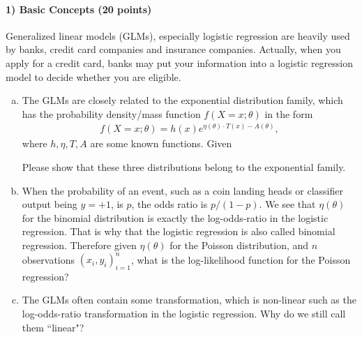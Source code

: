 \documentclass[11pt]{article}
\begin{document}
\paragraph{1) Basic Concepts (20 points)}
Generalized linear models (GLMs), especially logistic regression are heavily used by banks, credit card companies and insurance companies. Actually, when you apply for a credit card, banks may put your information into a logistic regression model to decide whether you are eligible.
\begin{enumerate}[(a)]
\item The GLMs are closely related to the exponential distribution family, which has the probability density/mass function $f(X=x; \theta)$ in the form
\begin{align}
f(X=x; \theta) = h(x)e^{\eta(\theta)\cdot T(x)-A(\theta)},
\end{align}
where $h,\eta,T,A$ are some known functions. Given 
Please show that these three distributions belong to the exponential family.

\item  When the
  probability of an event, such as a coin landing heads or classifier
  output being $y = +1$, is $p$, the odds ratio is
  $p/(1-p)$. We see that $\eta(\theta)$ for the binomial distribution is
  exactly the log-odds-ratio in the logistic regression. That is why that the logistic regression is also called binomial regression. Therefore given $\eta(\theta)$ for the Poisson distribution, and $n$ observations $(x_i, y_i)_{i=1}^n$, what is the log-likelihood function for the Poisson regression?

\item The GLMs often contain some transformation, which is non-linear such as the log-odds-ratio transformation in the logistic regression. Why do we still call them ``linear"?

\end{enumerate}
\end{document}
